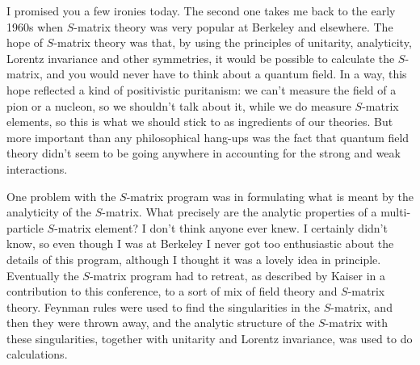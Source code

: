 \documentclass[12pt]{article}
\begin{document}
I promised you a few ironies today. The second one takes me
back to the early 1960s when $S$-matrix theory was very
popular at Berkeley and elsewhere.  The hope of $S$-matrix
theory was that, by using the principles of unitarity,
analyticity, Lorentz invariance and other symmetries, it
would be possible to calculate the $S$-matrix, and you would
never have to think about a quantum field. In a way, this
hope reflected a kind of positivistic puritanism: we can't
measure the field of a pion or a nucleon, so we shouldn't
talk about it, while we do measure $S$-matrix elements, so
this is what we should stick to as ingredients of our
theories. But more important than any philosophical hang-ups
was the fact that  quantum field theory  didn't seem to be
going anywhere in accounting for the strong and weak
interactions.

One problem with the $S$-matrix program was in formulating
what is meant by the analyticity of the $S$-matrix.    What
precisely are the analytic properties of a multi-particle
$S$-matrix element?  I don't think anyone ever knew.  I
certainly didn't know, so even though I was at Berkeley I
never got too enthusiastic about the details of this
program, although I thought it was a lovely idea in
principle. Eventually the $S$-matrix program had to retreat,
as described by Kaiser in a contribution to this conference,
to a sort of mix of field theory and $S$-matrix theory.
Feynman rules were used to find the singularities in the
$S$-matrix, and then they were thrown away, and the analytic
structure of the $S$-matrix with these singularities,
together with unitarity and Lorentz invariance, was used to
do calculations.
\end{document}
